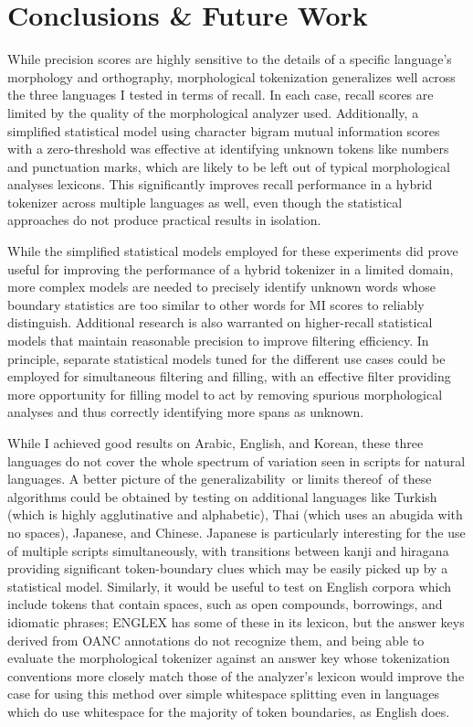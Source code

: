 \chapter{Conclusions \& Future Work}

While precision scores are highly sensitive to the details of a specific language's morphology and orthography, morphological tokenization generalizes well across the three languages I tested in terms of recall. In each case, recall scores are limited by the quality of the morphological analyzer used. Additionally, a simplified statistical model using character bigram mutual information scores with a zero-threshold was effective at identifying unknown tokens like numbers and punctuation marks, which are likely to be left out of typical morphological analyses lexicons. This significantly improves recall performance in a hybrid tokenizer across multiple languages as well, even though the statistical approaches do not produce practical results in isolation.

While the simplified statistical models employed for these experiments did prove useful for improving the performance of a hybrid tokenizer in a limited domain, more complex models are needed to precisely identify unknown words whose boundary statistics are too similar to other words for MI scores to reliably distinguish. Additional research is also warranted on higher-recall statistical models that maintain reasonable precision to improve filtering efficiency. In principle, separate statistical models tuned for the different use cases could be employed for simultaneous filtering and filling, with an effective filter providing more opportunity for filling model to act by removing spurious morphological analyses and thus correctly identifying more spans as unknown.

While I achieved good results on Arabic, English, and Korean, these three languages do not cover the whole spectrum of variation seen in scripts for natural languages. A better picture of the generalizability\textemdash~or limits thereof\textemdash~of these algorithms could be obtained by testing on additional languages like Turkish (which is highly agglutinative and alphabetic), Thai (which uses an abugida with no spaces), Japanese, and Chinese.
Japanese is particularly interesting for the use of multiple scripts simultaneously, with transitions between kanji and hiragana providing significant token-boundary clues which may be easily picked up by a statistical model. Similarly, it would be useful to test on English corpora which include tokens that contain spaces, such as open compounds, borrowings, and idiomatic phrases; ENGLEX has some of these in its lexicon, but the answer keys derived from OANC annotations do not recognize them, and being able to evaluate the morphological tokenizer against an answer key whose tokenization conventions more closely match those of the analyzer's lexicon would improve the case for using this method over simple whitespace splitting even in languages which do use whitespace for the majority of token boundaries, as English does.

